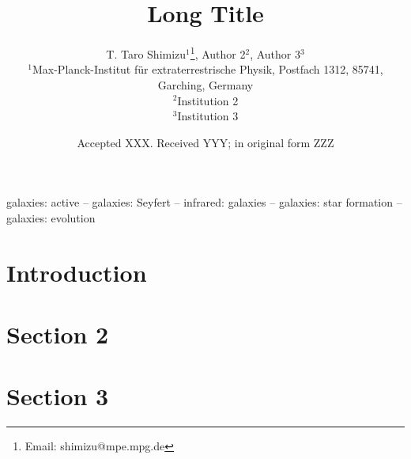 \documentclass[fleqn, usenatbib]{mnras}
\title[Short Title]{Long Title}
\author[Short Author]{T. Taro Shimizu$^{1}$\thanks{Email: shimizu@mpe.mpg.de}, Author 2$^{2}$, Author 3$^{3}$\\
$^{1}$Max-Planck-Institut f\"{u}r extraterrestrische Physik, Postfach 1312, 85741, Garching, Germany\\
$^{2}$Institution 2\\
$^{3}$Institution 3}
\date{Accepted XXX. Received YYY; in original form ZZZ}
\begin{document}
\label{firstpage}
\pagerange{\pageref{firstpage}--\pageref{lastpage}}
\maketitle

\begin{abstract}
\end{abstract}

\begin{keywords}
galaxies: active -- galaxies: Seyfert -- infrared: galaxies -- galaxies: star formation -- galaxies: evolution 
\end{keywords}



\section{Introduction}

\section{Section 2}


\section{Section 3}
\end{document}
